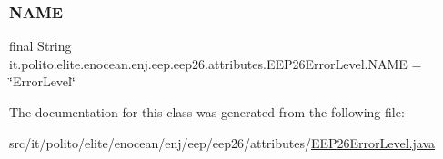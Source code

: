 \subsubsection{\texorpdfstring{N\+A\+ME}{NAME}}
{\footnotesize\ttfamily final String it.\+polito.\+elite.\+enocean.\+enj.\+eep.\+eep26.\+attributes.\+E\+E\+P26\+Error\+Level.\+N\+A\+ME = \char`\"{}Error\+Level\char`\"{}\hspace{0.3cm}{\ttfamily [static]}}



The documentation for this class was generated from the following file\+:\begin{DoxyCompactItemize}
\item 
src/it/polito/elite/enocean/enj/eep/eep26/attributes/\hyperlink{_e_e_p26_error_level_8java}{E\+E\+P26\+Error\+Level.\+java}\end{DoxyCompactItemize}
